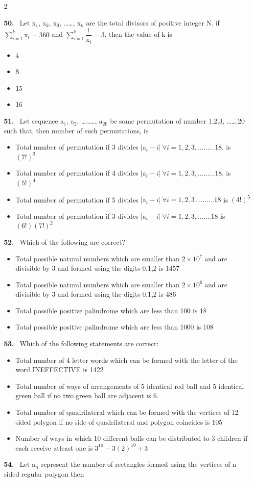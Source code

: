 \documentclass[10pt]{extarticle}
\newcommand{\qn}[1]{\par\smallskip\noindent\textbf{#1.}~}
\newenvironment{qoptions}{\begin{itemize}[leftmargin=1.8em,itemsep=1pt,topsep=2pt,label={}]}{\end{itemize}}
\newcommand{\opt}[2]{\item[(#1)] #2}
\begin{document}
\begin{multicols}{2}
\begin{qoptions}
\end{qoptions}
\qn{50} Let x$_1$, x$_2$, x$_3$, \dots\dots, x$_k$ are the total divisors of positive integer N. if $\displaystyle\sum_{i=1}^{k}\mathrm x_i=360$ and $\displaystyle\sum_{i=1}^{k}\dfrac1{\mathrm x_i}=3$, then the value of k is
\begin{qoptions}
\opt{A}{4}
\opt{B}{8}
\opt{C}{15}
\opt{D}{16}
\end{qoptions}
\qn{51} Let sequence a$_1$, a$_2$, \dots\dots\dots, a$_{20}$ be some permutation of number 1,2,3, \dots\dots.20 such that, then number of such permutations, is
\begin{qoptions}
\opt{A}{Total number of permutation if 3 divides $|\mathrm a_i-i|\ \forall i=1,2,3,\dots\dots\dots18$, is $(7!)^3$}
\opt{B}{Total number of permutation if 4 divides $|\mathrm a_i-i|\ \forall i=1,2,3,\dots\dots\dots18$, is $(5!)^4$}
\opt{C}{Total number of permutation if 5 divides $|\mathrm a_i-i|\ \forall i=1,2,3\,,\dots\dots..18$ is $(4!)^5$}
\opt{D}{Total number of permutation if 3 divides $|\mathrm a_i-i|\ \forall i=1,2,3,\dots\dots.18$ is $(6!)(7!)^2$}
\end{qoptions}
\qn{52} Which of the following are correct?
\begin{qoptions}
\opt{A}{Total possible natural numbers which are smaller than $2\times10^7$ and are divisible by 3 and formed using the digits 0,1,2 is 1457}
\opt{B}{Total possible natural numbers which are smaller than $2\times10^6$ and are divisible by 3 and formed using the digits 0,1,2 is 486}
\opt{C}{Total possible positive palindrome which are less than 100 is 18}
\opt{D}{Total possible positive palindrome which are less than 1000 is 108}
\end{qoptions}
\qn{53} Which of the following statements are correct:
\begin{qoptions}
\opt{A}{Total number of 4 letter words which can be formed with the letter of the word INEFFECTIVE is 1422}
\opt{B}{Total number of ways of arrangements of 5 identical red ball and 5 identical green ball if no two green ball are adjacent is 6.}
\opt{C}{Total number of quadrilateral which can be formed with the vertices of 12 sided polygon if no side of quadrilateral and polygon coincides is 105}
\opt{D}{Number of ways in which 10 different balls can be distributed to 3 children if each receive atleast one is $3^{10}-3(2)^{10}+3$}
\end{qoptions}
\qn{54} Let a$_n$ represent the number of rectangles formed using the vertices of n sided regular polygon then
\begin{qoptions}

\end{qoptions}
\end{multicols}
\end{document}
